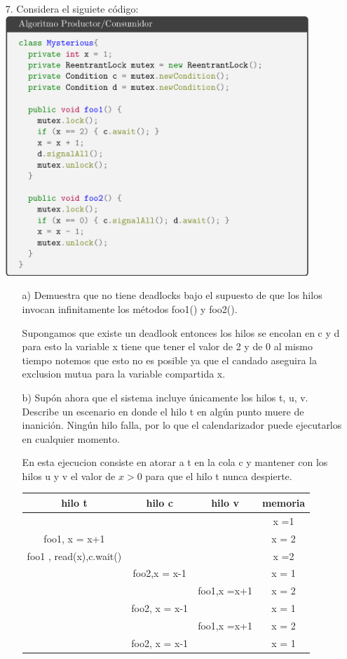 \documentclass[12pt, letterpaper]{article}
\begin{document}
\begin{itemize}
\item[7. ]Considera el siguiete código:\\

\includegraphics[width=0.9\textwidth]{siete.png}\\
\begin{itemize}
\item[a) ]Demuestra que no tiene deadlocks bajo el supuesto de que los hilos invocan infinitamente los métodos foo1() y foo2().

Supongamos que existe un deadlook entonces los hilos se encolan en c y d para esto la variable x tiene que tener el valor de 2 y de 0 al mismo tiempo notemos que esto no es posible ya que el candado aseguira la exclusion mutua para la variable compartida x.

\item[b) ]Supón ahora que el sistema incluye únicamente los hilos t, u, v. Describe
un escenario en donde el hilo t en algún punto muere de inanición. Ningún
hilo falla, por lo que el calendarizador puede ejecutarlos en cualquier
momento.

En esta ejecucion consiste en atorar a t en la cola c y mantener con los hilos u y v el valor de $x > 0$ para que el hilo t nunca despierte.


\begin{center}



\begin{tabular}{|c|c|c|c|}
\hline 
hilo t & hilo c & hilo v & memoria \\ 
\hline 
 &  &  & x =1 \\ 
\hline 
foo1, x = x+1 &  &  & x = 2 \\ 
\hline 
foo1 , read(x),c.wait() &  &  & x =2 \\ 
\hline 
 & foo2,x = x-1 &  & x = 1 \\ 
\hline 
 &  & foo1,x =x+1 & x = 2 \\ 
\hline 
 & foo2, x = x-1 &  & x = 1 \\ 
\hline 
 &  & foo1,x =x+1 &  x = 2 \\ 
\hline 
 & foo2, x = x-1 &  & x = 1 \\ 
\hline 
\end{tabular} 


\end{center}
\end{itemize}
\end{itemize}
\end{document}
